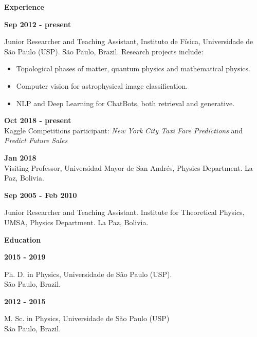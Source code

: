 \documentclass[a4paper,12pt,final]{memoir}
\newcommand{\SmallSep}{\vspace{0.5em}}
\newcommand{\CVSection}[1]
	{\Large\textbf{#1}\par
	\SmallSep\normalsize\normalfont}
\newcommand{\CVItem}[1]
	{\textbf{\color{RoyalBlue} #1}}
\begin{document}
\vspace{-20pt} 
\CVSection{Experience}
\CVItem{Sep 2012 - present}\\
\begin{small}
Junior Researcher and Teaching Assistant,  Instituto de F\'{i}sica, Universidade de S\~{a}o Paulo 
(USP). S\~{a}o Paulo, Brazil. 
Research projects include: 
\end{small}
\begin{footnotesize}
\begin{itemize}
\item Topological phases of matter, quantum physics and mathematical physics.
\item Computer vision for astrophysical image classification.
\item NLP and Deep Learning for ChatBots, both retrieval and generative.
\end{itemize}
\end{footnotesize}

\SmallSep

\CVItem{Oct 2018 - present}\\
{\small Kaggle Competitions participant: \emph{New York City Taxi Fare Predictions} and \emph{Predict Future Sales}}
\SmallSep


\CVItem{Jan 2018}\\
{\small Visiting Professor, Universidad Mayor de San Andr\'{e}s, Physics Department. La Paz, Bolivia.}
\SmallSep

\CVItem{Sep 2005 - Feb 2010}\\
\begin{small}
Junior Researcher and Teaching Assistant. Institute for Theoretical Physics,
UMSA, Physics Department. La Paz, Bolivia. 
\end{small}

\SmallSep

\CVSection{Education}
\CVItem{2015 - 2019}\\
\begin{small}
 Ph. D. in Physics, Universidade de S\~{a}o Paulo (USP).\\ 
S\~{a}o Paulo, Brazil.
 \end{small} 
\SmallSep

\CVItem{2012 - 2015}\\
\begin{small}
M. Sc. in Physics, Universidade de S\~{a}o Paulo (USP)\\
S\~{a}o Paulo, Brazil.
\end{small}
\SmallSep
\end{document}
